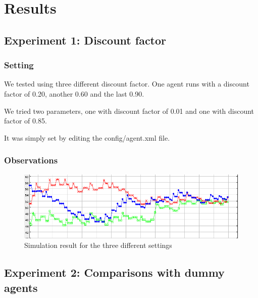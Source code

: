 \documentclass[11pt]{article}
\begin{document}
\section{Results}

\subsection{Experiment 1: Discount factor}

\subsubsection{Setting}
We tested using three different discount factor. One agent runs with a
discount factor of 0.20, another 0.60 and the last 0.90.

We tried two parameters, one with discount factor of 0.01 and one with discount
factor of 0.85.

It was simply set by editing the config/agent.xml file.

\subsubsection{Observations}
\begin{figure}
  \caption{Simulation result for the three different settings}
  \includegraphics[scale=0.7]{compare_discount}
  \centering
\end{figure}

\subsection{Experiment 2: Comparisons with dummy agents}
\end{document}
